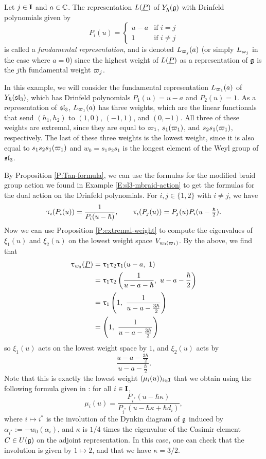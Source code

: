 \begin{example}\label{E:dual-braid-sl3}
    Let $j\in\mathbf{I}$ and $a\in\mathbb{C}$.
    The representation $L(\underline{P})$ of $Y_\hbar^{}(\mathfrak{g})$ with Drinfeld polynomials given by
    \[P_i(u) =
    \begin{cases}
        u-a & \text{if } i=j \\
        1 & \text{if } i\neq j
    \end{cases}\]
    is called a \emph{fundamental representation}, and is denoted $L_{\varpi_j}(a)$ (or simply $L_{\varpi_j}$ in the case where $a=0$) since the highest weight of $L(\underline{P})$ as a representation of $\mathfrak{g}$ is the $j$th fundamental weight $\varpi_j$.

    In this example, we will consider the fundamental representation $L_{\varpi_1}(a)$ of $Y_\hbar(\mathfrak{sl}_3)$, which has Drinfeld polynomials $P_1(u) = u-a$ and $P_2(u) = 1$.
    As a representation of $\mathfrak{sl}_3$, $L_{\varpi_1}(a)$ has three weights, which are the linear functionals that send $(h_1,h_2)$ to $(1,0)$, $(-1,1)$, and $(0,-1)$.
    All three of these weights are extremal, since they are equal to $\varpi_1$, $s_1(\varpi_1)$, and $s_2s_1(\varpi_1)$, respectively.
    The last of these three weights is the lowest weight, since it is also equal to $s_1s_2s_1(\varpi_1)$ and $w_0 = s_1s_2s_1$ is the longest element of the Weyl group of $\mathfrak{sl}_3$.

    By Proposition \ref{P:Tan-formula}, we can use the formulas for the modified braid group action we found in Example \ref{E:sl3-mbraid-action} to get the formulas for the dual action on the Drinfeld polynomials.
    For $i,j\in\{1,2\}$ with $i\neq j$, we have
    \[\uptau_i(P_i(u)) = \frac{1}{P_i(u-\hbar)}, \qquad \uptau_i(P_j(u)) = P_j(u)P_i(u-\tfrac{\hbar}{2}).\]
    Now we can use Proposition \ref{P:extremal-weight} to compute the eigenvalues of $\xi_1(u)$ and $\xi_2(u)$ on the lowest weight space $V_{w_0(\varpi_1)}$.
    By the above, we find that
    \begin{align*}
        \braid_{w_0}(\uP) & = \braid_1\braid_2\braid_1(u-a,\ 1) \\
        &= \braid_1\braid_2\left(\frac{1}{u-a-\hbar},\ u-a-\frac{\hbar}{2}\right) \\
        &= \braid_1\left(1,\ \frac{1}{u-a-\frac{3\hbar}{2}}\right) \\
        &= \left(1,\ \frac{1}{u-a-\frac{3\hbar}{2}}\right)
    \end{align*}
    so $\xi_1(u)$ acts on the lowest weight space by $1$, and $\xi_2(u)$ acts by
    \[\frac{u-a-\frac{3\hbar}{2}}{u-a-\frac{\hbar}{2}}.\]
    Note that this is exactly the lowest weight $(\mu_i(u))_{i\in\mathbf{I}}$ that we obtain using the following formula given in \cite[Prop. 3.5]{gautam_poles_2023}: for all $i\in\mathbf{I}$,
    \[\mu_i(u) = \frac{P_{i^*}(u-\hbar\kappa)}{P_{i^*}(u-\hbar\kappa+\hbar d_i)},\]
    where $i\mapsto i^*$ is the involution of the Dynkin diagram of $\mathfrak{g}$ induced by $\alpha_{i^*} := -w_0(\alpha_i)$, and $\kappa$ is $1/4$ times the eigenvalue of the Casimir element $C\in U(\mathfrak{g})$ on the adjoint representation.
    In this case, one can check that the involution is given by $1\mapsto 2$, and that we have $\kappa = 3/2$.
\end{example}
